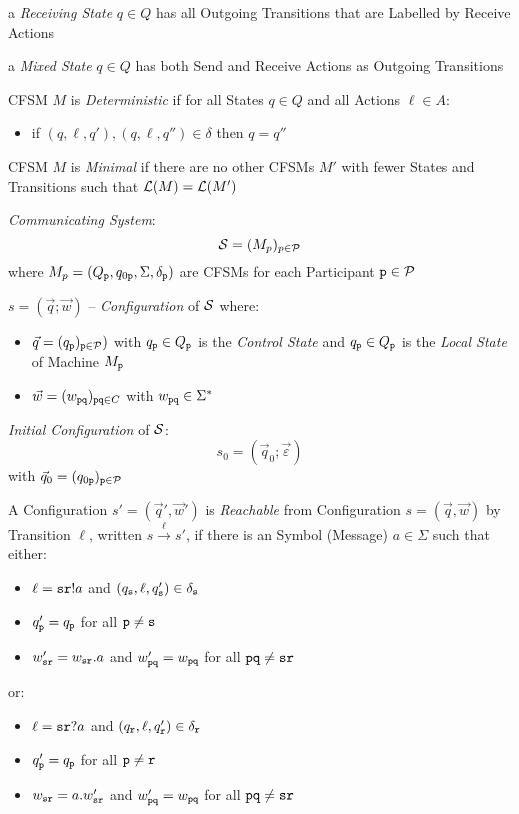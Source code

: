 a \emph{Receiving State} $q \in Q$ has all Outgoing Transitions that are
Labelled by Receive Actions

a \emph{Mixed State} $q \in Q$ has both Send and Receive Actions as
Outgoing Transitions

CFSM $M$ is \emph{Deterministic} if for all States $q \in Q$ and all
Actions $\ell \in A$:
\begin{itemize}
  \item if $(q,\ell,q'),(q,\ell,q'') \in \delta$ then $q = q''$
\end{itemize}

CFSM $M$ is \emph{Minimal} if there are no other CFSMs $M'$ with fewer
States and Transitions such that $\mathcal{L}(M) = \mathcal{L}(M')$

\emph{Communicating System}:
\[
  \mathcal{S} = (M_p)_{p \in \mathcal{P}}
\]
where $M_p = (Q_\mathtt{p}, q_{0\mathtt{p}}, \Sigma, \delta_\mathtt{p})$
are CFSMs for each Participant $\mathtt{p} \in \mathcal{P}$

$s = (\vec{q};\vec{w})$ -- \emph{Configuration} of $\mathcal{S}$
where:
\begin{itemize}
  \item $\vec{q} = (q_\mathtt{p})_{\mathtt{p} \in \mathcal{P}})$ with
    $q_\mathtt{p} \in Q_\mathtt{p}$ is the \emph{Control State} and
    $q_\mathtt{p} \in Q_\mathtt{p}$ is the \emph{Local State} of Machine
    $M_\mathtt{p}$
  \item $\vec{w} = (w_\mathtt{pq})_{\mathtt{pq} \in C}$ with
    $w_\mathtt{pq} \in \Sigma^*$
\end{itemize}

\emph{Initial Configuration} of $\mathcal{S}$:
\[
  s_0 = (\vec{q}_0;\vec{\varepsilon})
\]
with $\vec{q}_0 = (q_{0\mathtt{p}})_{\mathtt{p} \in \mathcal{P}}$

A Configuration $s' = (\vec{q}',\vec{w}')$ is \emph{Reachable} from
Configuration $s = (\vec{q},\vec{w})$ by Transition $\ell$, written $s
\xrightarrow{\ell} s'$, if there is an Symbol (Message) $a \in \Sigma$
such that either:
\begin{itemize}
  \item $\ell = \mathtt{sr}!a$ and $(q_\mathtt{s},\ell,q_\mathtt{s}') \in
    \delta_\mathtt{s}$
  \item $q_\mathtt{p}' = q_\mathtt{p}$ for all $\mathtt{p \neq s}$
  \item $w_\mathtt{sr}' = w_\mathtt{sr}.a$ and $w_\mathtt{pq}' =
    w_\mathtt{pq}$ for all $\mathtt{pq \neq sr}$
\end{itemize}
or:
\begin{itemize}
  \item $\ell = \mathtt{sr}?a$ and $(q_\mathtt{r},\ell,q_\mathtt{r}') \in
    \delta_\mathtt{r}$
  \item $q_\mathtt{p}' = q_\mathtt{p}$ for all $\mathtt{p \neq r}$
  \item $w_\mathtt{sr} = a.w_\mathtt{sr}'$ and $w_\mathtt{pq}' =
    w_\mathtt{pq}$ for all $\mathtt{pq \neq sr}$
\end{itemize}

